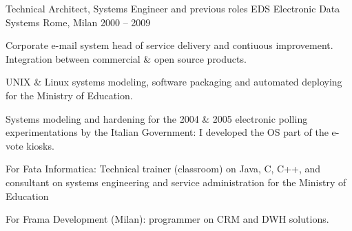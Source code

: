 \begin{cventries}
  \cventry
    {Technical Architect, Systems Engineer and previous roles} %
    {EDS Electronic Data Systems} %
    {Rome, Milan} %
    {2000 -- 2009} %
    {
      \begin{cvitems} %
				\item {Corporate e-mail system head of service delivery and contiuous improvement. Integration between commercial \& open source products.}
				\item {UNIX \& Linux systems modeling, software packaging and automated deploying for the Ministry of Education.}
				\item {Systems modeling and hardening for the 2004 \& 2005 electronic polling experimentations by the Italian Government: I developed the OS part of the e-vote kiosks.}
				\item {For Fata Informatica: Technical trainer (classroom) on Java, C, C++, and consultant on systems engineering and service administration for the Ministry of Education}
				\item {For Frama Development (Milan): programmer on CRM and DWH solutions.}
      \end{cvitems}
    }

\end{cventries}
